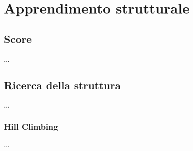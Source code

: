 
\chapter{Apprendimento strutturale}
\label{cap:ctbn-structural-learning}
\lipsum[1]




\section{Score}
\label{sec:ctbn-score}
...

\section{Ricerca della struttura}
\label{sec:ctbn-graph-search}
...

\subsection{Hill Climbing}
\label{sec:hc}
...
